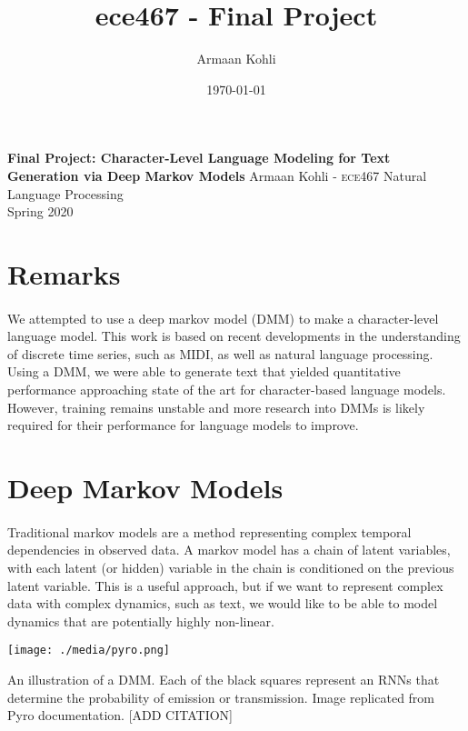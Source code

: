 \documentclass[justified,nobib]{tufte-handout}
\title{ece467 - Final Project}
\author{Armaan Kohli}
\date{\today}
\begin{document}
\begin{fullwidth}
{
  \noindent\fontsize{12pt}{20pt}\selectfont\textbf{Final Project: Character-Level Language Modeling for Text Generation via Deep Markov Models}
  \newline
  \fontsize{12pt}{18pt}\selectfont
  {Armaan Kohli - \scshape ece}467 Natural Language Processing \\Spring 2020\\
}
\raggedright
\raggedbottom
\section{Remarks}
\paragraph{} We attempted to use a deep markov model (DMM) to make a character-level language model. This work is based on recent developments in the understanding of discrete time series, such as MIDI, as well as natural language processing. Using a DMM, we were able to generate text that yielded quantitative performance approaching state of the art for character-based language models. However, training remains unstable and more research into DMMs is likely required for their performance for language models to improve. 

\section{Deep Markov Models}
\paragraph{}
Traditional markov models are a method representing complex temporal dependencies in observed data. A markov model has a chain of latent variables, with each latent (or hidden) variable in the chain is conditioned on the previous latent variable. This is a useful approach, but if we want to represent complex data with complex dynamics, such as text, we would like to be able to model dynamics that are potentially highly non-linear.
\end{fullwidth}
\begin{marginfigure}[1.5in]
\texttt{[image: ./media/pyro.png]}
\caption{An illustration of a DMM. Each of the black squares represent an RNNs that determine the probability of emission or transmission. Image replicated from Pyro documentation. [ADD CITATION]}
\label{fig:dmm}
\end{marginfigure}
\end{document}
